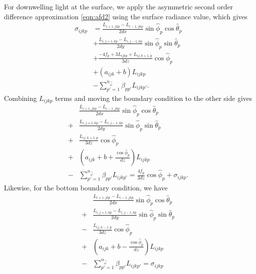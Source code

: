For downwelling light at the surface, we apply the asymmetric second order difference approximation \eqref{eqn:afd2}
using the surface radiance value, which gives
\begin{equation*}
  \begin{aligned}
    \sigma_{ijkp} &= \frac{L_{i+1,jkp}-L_{i-1,jkp}}{2dx}\sin\hat{\phi}_p\cos\hat{\theta}_p \\
    &+ \frac{L_{i,j+1,kp}-L_{i,j-1,kp}}{2dy}\sin\hat{\phi}_p\sin\hat{\theta}_p \\
    &+ \frac{-4f_p + 3L_{ijkp} + L_{ij,k+1,p}}{3dz}\cos\hat{\phi}_p \\
    &+ (a_{ijk}+b)L_{ijkp} \\
    &- \sum_{p'=1}^{n_{\vec{\omega}}} \beta_{pp'} L_{ijkp'}.
  \end{aligned}
\end{equation*}
Combining $L_{ijkp}$ terms and moving the boundary condition to the other side gives
\begin{equation*}
  \begin{aligned}
    &\frac{L_{i+1,jkp}-L_{i-1,jkp}}{2dx}\sin\hat{\phi}_p\cos\hat{\theta}_p \\
    + &\frac{L_{i,j+1,kp}-L_{i,j-1,kp}}{2dy}\sin\hat{\phi}_p\sin\hat{\theta}_p \\
    + &\frac{L_{ij,k+1,p}}{3dz}\cos\hat{\phi}_p \\
    + &\left(a_{ijk}+b + \frac{\cos\hat{\phi}_p}{dz} \right) L_{ijkp} \\
    - &\sum_{p'=1}^{n_{\vec{\omega}}} \beta_{pp'} L_{ijkp'} = \frac{4f_p}{3dz} \cos\hat{\phi}_p + \sigma_{ijkp}.
  \end{aligned}
\end{equation*}
Likewise, for the bottom boundary condition, we have
\begin{equation*}
  \begin{aligned}
    &\frac{L_{i+1,jkp}-L_{i-1,jkp}}{2dx}\sin\hat{\phi}_p\cos\hat{\theta}_p \\
    + &\frac{L_{i,j+1,kp}-L_{i,j-1,kp}}{2dy}\sin\hat{\phi}_p\sin\hat{\theta}_p \\
    - &\frac{L_{ij,k-1,p}}{3dz}\cos\hat{\phi}_p \\
    + &\left(a_{ijk}+b - \frac{\cos\hat{\phi}_p}{dz} \right) L_{ijkp} \\
    - &\sum_{p'=1}^{n_{\vec{\omega}}} \beta_{pp'} L_{ijkp'} = \sigma_{ijkp}
  \end{aligned}
\end{equation*}

